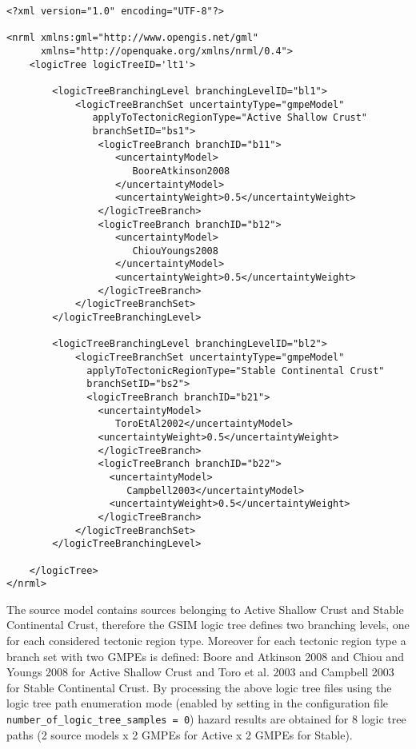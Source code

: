 \begin{Verbatim}[frame=single, commandchars=\\\{\}, fontsize=\normalsize]
<?xml version="1.0" encoding="UTF-8"?>

<nrml xmlns:gml="http://www.opengis.net/gml"
      xmlns="http://openquake.org/xmlns/nrml/0.4">
    <logicTree logicTreeID='lt1'>

        <logicTreeBranchingLevel branchingLevelID="bl1">
            <logicTreeBranchSet uncertaintyType="gmpeModel"
               applyToTectonicRegionType="Active Shallow Crust"
               branchSetID="bs1">
                <logicTreeBranch branchID="b11">
                   <uncertaintyModel>
                      BooreAtkinson2008
                   </uncertaintyModel>
                   <uncertaintyWeight>0.5</uncertaintyWeight>
                </logicTreeBranch>
                <logicTreeBranch branchID="b12">
                   <uncertaintyModel>
                      ChiouYoungs2008
                   </uncertaintyModel>
                   <uncertaintyWeight>0.5</uncertaintyWeight>
                </logicTreeBranch>
            </logicTreeBranchSet>
        </logicTreeBranchingLevel>

        <logicTreeBranchingLevel branchingLevelID="bl2">
            <logicTreeBranchSet uncertaintyType="gmpeModel"
              applyToTectonicRegionType="Stable Continental Crust"
              branchSetID="bs2">
              <logicTreeBranch branchID="b21">
                <uncertaintyModel>
                   ToroEtAl2002</uncertaintyModel>
                <uncertaintyWeight>0.5</uncertaintyWeight>
                </logicTreeBranch>
                <logicTreeBranch branchID="b22">
                  <uncertaintyModel>
                     Campbell2003</uncertaintyModel>
                  <uncertaintyWeight>0.5</uncertaintyWeight>
                </logicTreeBranch>
            </logicTreeBranchSet>
        </logicTreeBranchingLevel>

    </logicTree>
</nrml>
\end{Verbatim}
The source model contains sources belonging to Active Shallow Crust and Stable Continental Crust, therefore the
GSIM logic tree defines two branching levels, one for each considered tectonic region type. Moreover for each tectonic
region type a branch set with two GMPEs is defined: Boore and Atkinson 2008 and Chiou and Youngs 2008 for Active
Shallow Crust and Toro et al. 2003 and Campbell 2003 for Stable Continental Crust. By processing the above logic tree
files using the logic tree path enumeration mode (enabled by setting in the configuration file \texttt{number\_\-of\_\-logic\_\-tree\_\-samples = 0})
hazard results are obtained for 8 logic tree paths (2 source models x 2 GMPEs for Active x 2 GMPEs for Stable).\\


